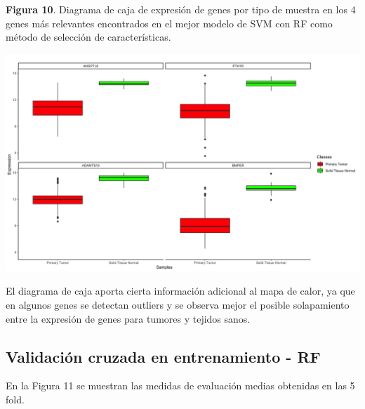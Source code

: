 \newpage
\begin{center}
\textbf{Figura 10}. Diagrama de caja de expresión de genes por tipo de muestra en los 4 genes más relevantes encontrados en el mejor modelo de SVM con RF como método de selección de características.
\end{center}
\begin{center}
	\includegraphics[width=1\textwidth]{figuras/10_higado_biclase_17_svm_boxplots_mejor_metodo.png} 
\end{center}

El diagrama de caja aporta cierta información adicional al mapa de calor, ya que en algunos genes se detectan outliers y se observa mejor el posible solapamiento entre la expresión de genes para tumores y tejidos sanos.

\newpage
\subsection{Validación cruzada en entrenamiento - RF}

En la Figura 11 se muestran las medidas de evaluación medias obtenidas en las 5 fold.\\

